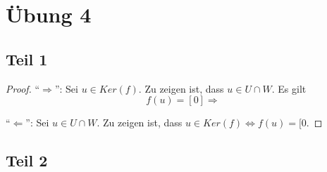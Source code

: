 \documentclass[a4paper,10pt]{article}
\begin{document}
\section*{Übung 4}

\subsection*{Teil 1}

\begin{proof}
 ``$\Rightarrow$'': Sei $u \in Ker(f)$.
 Zu zeigen ist, dass $u \in U \cap W$.
 Es gilt
 \begin{equation}
  f(u) = [0] \Rightarrow 
 \end{equation}

 
 ``$\Leftarrow$'': Sei $u \in U \cap W$.
 Zu zeigen ist, dass $u \in Ker(f) \Leftrightarrow f(u) = [0$.
 
\end{proof}

\subsection*{Teil 2}
\end{document}
